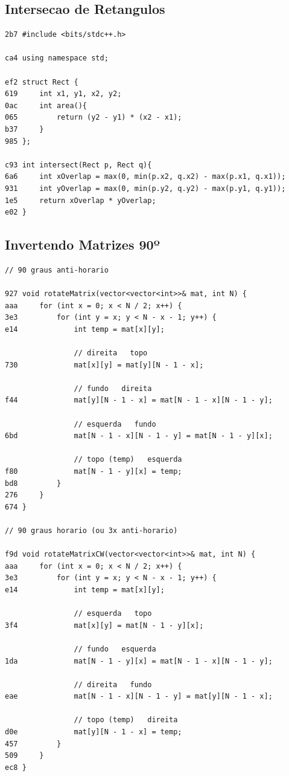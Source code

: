 \documentclass[11pt, a4paper, twoside]{article}
\begin{document}
\subsection{Intersecao de Retangulos}
\begin{lstlisting}
2b7 #include <bits/stdc++.h>

ca4 using namespace std;

ef2 struct Rect {
619     int x1, y1, x2, y2;
0ac     int area(){
065         return (y2 - y1) * (x2 - x1);
b37     }
985 };

c93 int intersect(Rect p, Rect q){
6a6     int xOverlap = max(0, min(p.x2, q.x2) - max(p.x1, q.x1));
931 	int yOverlap = max(0, min(p.y2, q.y2) - max(p.y1, q.y1));
1e5 	return xOverlap * yOverlap;
e02 }
\end{lstlisting}

\subsection{Invertendo Matrizes 90º}
\begin{lstlisting}
// 90 graus anti-horario

927 void rotateMatrix(vector<vector<int>>& mat, int N) {
aaa     for (int x = 0; x < N / 2; x++) {
3e3         for (int y = x; y < N - x - 1; y++) {
e14             int temp = mat[x][y];
    
                // direita   topo
730             mat[x][y] = mat[y][N - 1 - x];
    
                // fundo   direita
f44             mat[y][N - 1 - x] = mat[N - 1 - x][N - 1 - y];
    
                // esquerda   fundo
6bd             mat[N - 1 - x][N - 1 - y] = mat[N - 1 - y][x];
    
                // topo (temp)   esquerda
f80             mat[N - 1 - y][x] = temp;
bd8         }
276     }
674 }

// 90 graus horario (ou 3x anti-horario)

f9d void rotateMatrixCW(vector<vector<int>>& mat, int N) {
aaa     for (int x = 0; x < N / 2; x++) {
3e3         for (int y = x; y < N - x - 1; y++) {
e14             int temp = mat[x][y];
    
                // esquerda   topo
3f4             mat[x][y] = mat[N - 1 - y][x];
    
                // fundo   esquerda
1da             mat[N - 1 - y][x] = mat[N - 1 - x][N - 1 - y];
    
                // direita   fundo
eae             mat[N - 1 - x][N - 1 - y] = mat[y][N - 1 - x];
    
                // topo (temp)   direita
d0e             mat[y][N - 1 - x] = temp;
457         }
509     }
ec8 }
\end{lstlisting}
\end{document}
